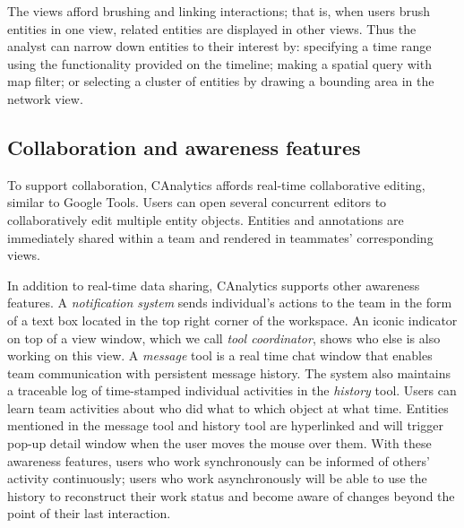 The views afford brushing and linking interactions;
that is, when users brush entities in one view, related
entities are displayed in other views. Thus the analyst can narrow down
entities to their interest by: specifying a time range using the functionality provided on the timeline; making a spatial query
with map filter; or selecting a cluster of entities by drawing a bounding
area in the network view.

\subsection{Collaboration and awareness features}

To support collaboration, CAnalytics affords real-time collaborative editing, similar to 
Google Tools. Users can open several concurrent editors to
collaboratively edit multiple entity objects. Entities and annotations are immediately
shared within a team and rendered in teammates' corresponding views.

In addition to real-time data sharing, CAnalytics supports other awareness features. A \emph{notification system} sends
individual's actions to the team in the form of a text box located in the top
right corner of the workspace. An iconic
indicator on top of a view window, which we call \emph{tool coordinator}, shows who else is also working on this view. A \emph{message} tool is a real time chat window that enables team
communication with persistent message history. The system also maintains
a traceable log of time-stamped individual activities in the \emph{history} tool.
Users can learn team activities about who did what to which object at
what time. Entities mentioned in the message tool and
history tool are hyperlinked and will trigger pop-up detail window when
the user moves the mouse over them. With these awareness features, users who work
synchronously can be informed of others' activity continuously; users
who work asynchronously will be able to use the history to reconstruct
their work status and become aware of changes beyond the point of their
last interaction.
